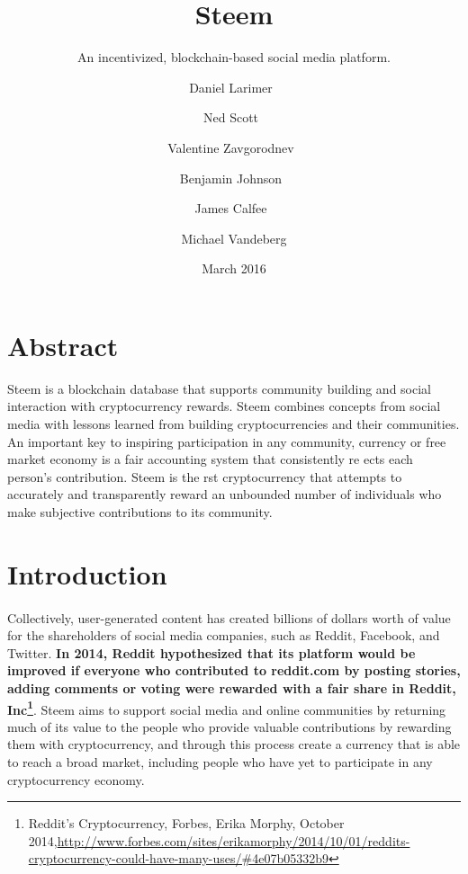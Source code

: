\documentclass{article}
\title{Steem}
\subtitle{An incentivized, blockchain-based social media platform.}
\date{March 2016}
\author{
    Daniel Larimer\
    \and
    Ned Scott\
    \and
    Valentine Zavgorodnev\
    \and
    Benjamin Johnson\
    \and
    James Calfee\
    \and
    Michael Vandeberg
    }
\begin{document}
  \renewcommand \thesection{\roman{section}}

  \maketitle

  \newpage

  \section{Abstract}

  Steem is a blockchain database that supports community building and social interaction with cryptocurrency rewards. Steem combines concepts from social media with lessons learned from building cryptocurrencies and their communities. An important key to inspiring participation in any community, currency or free market economy is a fair accounting system that consistently re ects each person's contribution. Steem is the  rst cryptocurrency that attempts to accurately and transparently reward an unbounded number of individuals who make subjective contributions to its community.

  \newpage

  \tableofcontents

  \newpage

  \setcounter{section}{0}

  \renewcommand \thesection{\arabic{section}}

    \section{Introduction}

        \paragraph{}
            Collectively, user-generated content has created billions of dollars worth of value for the shareholders of social media companies, such as Reddit, Facebook, and Twitter. \textbf{In 2014, Reddit hypothesized that its platform would be improved if everyone who contributed to reddit.com by posting stories, adding comments or voting were rewarded with a fair share in Reddit, Inc\footnote{Reddit's Cryptocurrency, Forbes, Erika Morphy, October 2014,\newline\url{http://www.forbes.com/sites/erikamorphy/2014/10/01/reddits-cryptocurrency-could-have-many-uses/\#4e07b05332b9}}}. Steem aims to support social media and online communities by returning much of its value to the people who provide valuable contributions by rewarding them with cryptocurrency, and through this process create a currency that is able to reach a broad market, including people who have yet to participate in any cryptocurrency economy.
\end{document}
